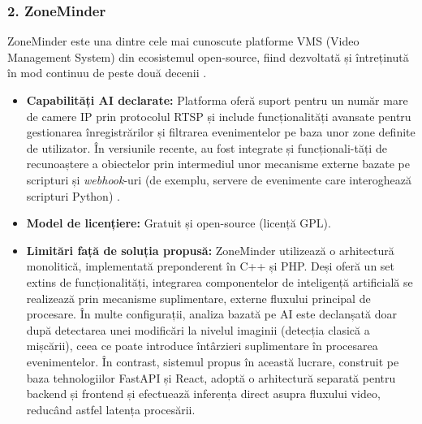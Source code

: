 \documentclass[../../main.tex]{subfiles}
\begin{document}
\subsubsection*{2. ZoneMinder}
ZoneMinder este una dintre cele mai cunoscute platforme VMS (Video Management System) din ecosistemul open-source, fiind dezvoltată și întreținută în mod continuu de peste două decenii \cite{zoneminder_docs}.
\begin{itemize}
	\item \textbf{Capabilități AI declarate:} Platforma oferă suport pentru un număr mare de camere IP prin protocolul RTSP și include funcționalități avansate pentru gestionarea înregistrărilor și filtrarea evenimentelor pe baza unor zone definite de utilizator. În versiunile recente, au fost integrate și funcționali-tăți de recunoaștere a obiectelor prin intermediul unor mecanisme externe bazate pe scripturi și \emph{webhook}-uri (de exemplu, servere de evenimente care interoghează scripturi Python) \cite{zoneminder_docs}.
	\item \textbf{Model de licențiere:} Gratuit și open-source (licență GPL).
	\item \textbf{Limitări față de soluția propusă:} ZoneMinder utilizează o arhitectură monolitică, implementată preponderent în C++ și PHP. Deși oferă un set extins de funcționalități, integrarea componentelor de inteligență artificială se realizează prin mecanisme suplimentare, externe fluxului principal de procesare. În multe configurații, analiza bazată pe AI este declanșată doar după detectarea unei modificări la nivelul imaginii (detecția clasică a mișcării), ceea ce poate introduce întârzieri suplimentare în procesarea evenimentelor. În contrast, sistemul propus în această lucrare, construit pe baza tehnologiilor FastAPI și React, adoptă o arhitectură separată pentru backend și frontend și efectuează inferența direct asupra fluxului video, reducând astfel latența procesării.
\end{itemize}
\end{document}

